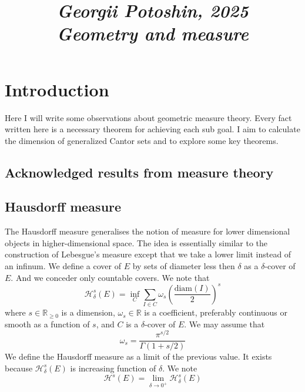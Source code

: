 \documentclass{article}
\begin{document}
\title{
\textit{\small{Georgii Potoshin, 2025}}\\
\vspace{0.3ex}
\textit{\huge{Geometry and measure}}\vspace{1ex}
}
\date{\vspace{-5ex}}
\maketitle


\date{\vspace{-10ex}}

\maketitle

\section{Introduction}
Here I will write some observations about geometric measure theory. Every fact
written here is a necessary theorem for achieving each sub goal. I aim to
calculate the dimension of generalized Cantor sets and to explore some key
theorems.

\subsection{Acknowledged results from measure theory}

\subsection{Hausdorff measure}
The Hausdorff measure generalises the notion of measure for lower dimensional
objects in higher-dimensional space. The idea is essentially similar to the
construction of Lebesgue's measure except that we take a lower limit instead of
an infinum. We define a cover of $E$ by sets of diameter less then $\delta$ as
a $\delta$-cover of $E$. And we conceder only countable covers. We note that
\[\mathcal{H}_\delta^s(E)=\inf_{C}\sum_{I\in C}\omega_s\left(\frac{\text{diam}(I)}{2}\right)^s\]
where $s\in\mathbb{R}_{\geq 0}$ is a dimension, $\omega_s\in\mathbb{R}$ is a
coefficient, preferably continuous or smooth as a function of $s$, and $C$ is a
$\delta$-cover of $E$. We may assume that
\[\omega_s = \frac{\pi^{s/2}}{\Gamma(1+s/2)}\]
We define the Hausdorff measure as a limit of the previous value. It exists
because $\mathcal{H}_\delta^s(E)$ is increasing function of $\delta$. We note
\[\mathcal{H}^s(E)=\lim_{\delta\rightarrow0^+}\mathcal{H}^s_\delta(E)\]
\end{document}
